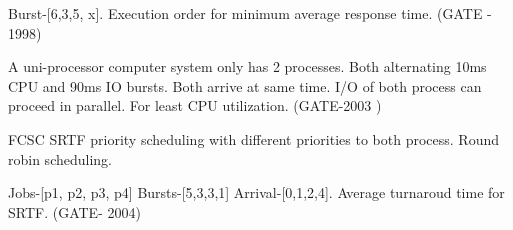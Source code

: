 \vspace{0.08in}



\begin{minipage}{\linewidth}

  \question  Burst-[6,3,5, x]. Execution order for minimum average response time. (GATE - 1998)


  \end{minipage}

\vspace{0.08in}



\begin{minipage}{\linewidth}

  \question  A uni-processor computer system only has 2 processes. Both alternating 10ms CPU and 90ms IO bursts.
             Both arrive at same time. I/O of both process can proceed in parallel. For least CPU utilization. (GATE-2003 )

  \begin{choices}
    \choice FCSC
    \choice SRTF
    \choice priority scheduling with different priorities to both process.
    \choice Round robin scheduling.
  \end{choices}


  \end{minipage}

\vspace{0.08in}



\begin{minipage}{\linewidth}

  \question  Jobs-[p1, p2, p3, p4] Bursts-[5,3,3,1] Arrival-[0,1,2,4]. Average turnaroud time for SRTF. (GATE- 2004)

  \begin{oneparchoices}
  \end{oneparchoices}

  \end{minipage}

\vspace{0.08in}



